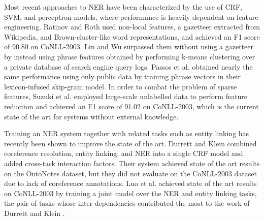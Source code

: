 \documentclass[11pt,letterpaper]{article}
\begin{document}
Most recent approaches to NER have been characterized by the use of CRF, SVM, and perceptron models, where performance is heavily dependent on feature engineering. Ratinov and Roth  used non-local features, a gazetteer extracted from Wikipedia, and Brown-cluster-like word representations, and achieved an F1 score of 90.80 on CoNLL-2003. Lin and Wu  surpassed them without using a gazetteer by instead using phrase features obtained by performing k-means clustering over a private database of search engine query logs. Passos et al.  obtained nearly the same performance using only public data by training phrase vectors in their lexicon-infused skip-gram model. In order to combat the problem of sparse features, Suzuki et al.  employed large-scale unlabelled data to perform feature reduction and achieved an F1 score of 91.02 on CoNLL-2003, which is the current state of the art for systems without external knowledge.

Training an NER system together with related tasks such as entity linking has recently been shown to improve the state of the art. Durrett and Klein  combined coreference resolution, entity linking, and NER into a single CRF model and added cross-task interaction factors. Their system achieved state of the art results on the OntoNotes dataset, but they did not evaluate on the CoNLL-2003 dataset due to lack of coreference annotations. Luo et al.  achieved state of the art results on CoNLL-2003 by training a joint model over the NER and entity linking tasks, the pair of tasks whose inter-dependencies contributed the most to the work of Durrett and Klein .
\end{document}
